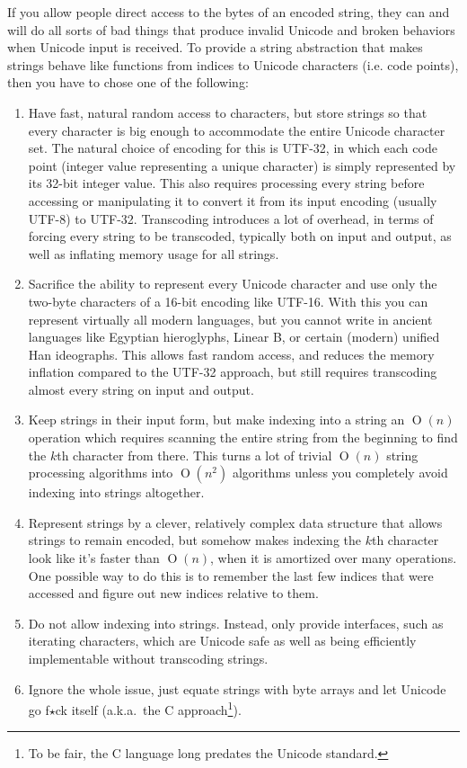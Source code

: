 \documentclass{article}
\renewcommand{\O}{\ensuremath{\operatorname{O}}}
\begin{document}
If you allow people direct access to the bytes of an encoded string, they can and will do all sorts of bad things that produce invalid Unicode and broken behaviors when Unicode input is received.
To provide a string abstraction that makes strings behave like functions from indices to Unicode characters (i.e. code points), then you have to chose one of the following:
\begin{enumerate}

\item Have fast, natural random access to characters, but store strings so that every character is big enough to accommodate the entire Unicode character set.
The natural choice of encoding for this is UTF-32, in which each code point (integer value representing a unique character) is simply represented by its 32-bit integer value.
This also requires processing every string before accessing or manipulating it to convert it from its input encoding (usually UTF-8) to UTF-32.
Transcoding introduces a lot of overhead, in terms of forcing every string to be transcoded, typically both on input and output, as well as inflating memory usage for all strings.

\item Sacrifice the ability to represent every Unicode character and use only the two-byte characters of a 16-bit encoding like UTF-16.
With this you can represent virtually all modern languages, but you cannot write in ancient languages like Egyptian hieroglyphs, Linear B, or certain (modern) unified Han ideographs.
This allows fast random access, and reduces the memory inflation compared to the UTF-32 approach, but still requires transcoding almost every string on input and output.

\item Keep strings in their input form, but make indexing into a string an $\O(n)$ operation which requires scanning the entire string from the beginning to find the $k$th character from there.
This turns a lot of trivial $\O(n)$ string processing algorithms into $\O(n^2)$ algorithms unless you completely avoid indexing into strings altogether.

\item Represent strings by a clever, relatively complex data structure that allows strings to remain encoded, but somehow makes indexing the $k$th character look like it's faster than $\O(n)$, when it is amortized over many operations.
One possible way to do this is to remember the last few indices that were accessed and figure out new indices relative to them.

\item Do not allow indexing into strings. Instead, only provide interfaces, such as iterating characters, which are Unicode safe as well as being efficiently implementable without transcoding strings.

\item Ignore the whole issue, just equate strings with byte arrays and let Unicode go f$\star$ck itself (a.k.a.~the C approach\footnote{To be fair, the C language long predates the Unicode standard.}).

\end{enumerate}
\end{document}
